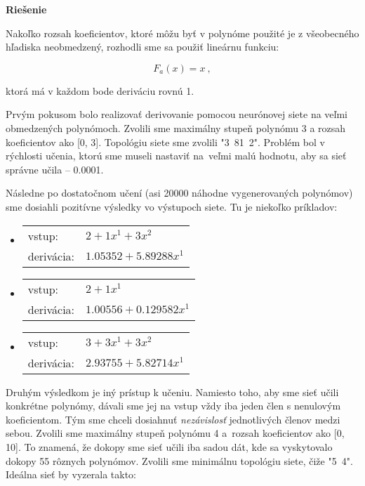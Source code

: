 \documentclass[12pt]{article}
\newcommand{\mysmallsection}[1]{\vspace{0.5cm}{\centering\large\textbf{#1}\\}\normalsize\vspace{0.5cm}}
\begin{document}
{\vspace*{0.5cm}\centering\textbf{Riešenie}\\}

Nakoľko rozsah koeficientov, ktoré môžu byť v polynóme použité je z všeobecného hľadiska neobmedzený, rozhodli sme sa použiť lineárnu funkciu: 

\begin{equation}
F_a(x)=x~,
\end{equation}

\noindent ktorá má v každom bode deriváciu rovnú 1.  

\mysmallsection{Výsledky}

Prvým pokusom bolo realizovať derivovanie pomocou neurónovej siete na veľmi obmedzených polynómoch. Zvolili sme maximálny stupeň polynómu 3 a rozsah koeficientov ako [0, 3]. Topológiu siete sme zvolili "3~81~2". Problém bol v rýchlosti učenia, ktorú sme museli nastaviť na~veľmi malú hodnotu, aby sa sieť správne učila -- 0.0001.

Následne po dostatočnom učení (asi 20000 náhodne vygenerovaných polynómov) sme dosiahli pozitívne výsledky vo výstupoch siete. Tu je niekoľko príkladov:

\begin{itemize}
\item \begin{tabular}{ l l }
		vstup: & $2 + 1x^1 + 3x^2$\\
		derivácia: & $1.05352 + 5.89288x^1 $
	  \end{tabular}
\item \begin{tabular}{ l l }
		vstup: & $2 + 1x^1$\\
		derivácia: & $1.00556 + 0.129582x^1$
	  \end{tabular}
\item \begin{tabular}{ l l }
		vstup: & $3 + 3x^1 + 3x^2$\\
		derivácia: & $2.93755 + 5.82714x^1$
	  \end{tabular}
\end{itemize}

Druhým výsledkom je iný prístup k učeniu. Namiesto toho, aby sme sieť učili konkrétne polynómy, dávali sme jej na vstup vždy iba jeden člen s nenulovým koeficientom. Tým sme chceli dosiahnuť \textit{nezávislosť} jednotlivých členov medzi sebou. Zvolili sme maximálny stupeň polynómu 4 a~rozsah koeficientov ako [0, 10]. To znamená, že dokopy sme sieť učili iba sadou dát, kde sa vyskytovalo dokopy 55 rôznych polynómov. Zvolili sme minimálnu topológiu siete, čiže "5~4". Ideálna sieť by vyzerala takto:
\end{document}
